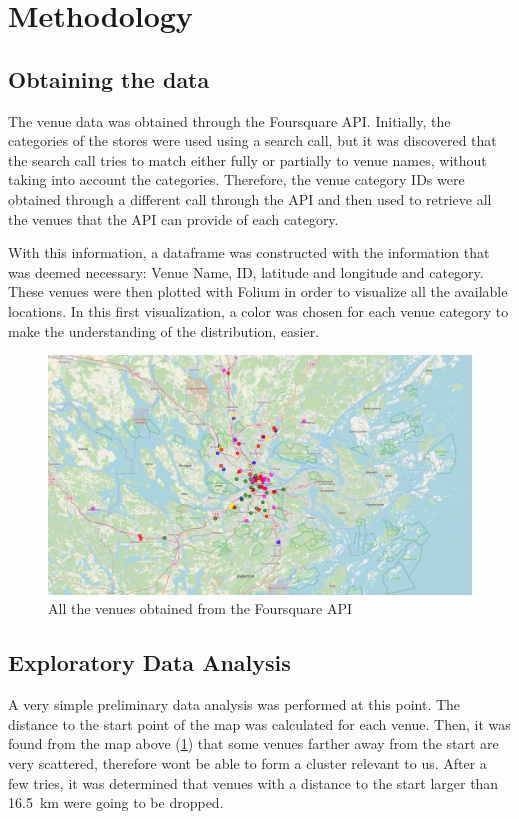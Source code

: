 \documentclass{article}
\begin{document}
\section{Methodology}

	\subsection{Obtaining the data}
		The venue data was obtained through the Foursquare API. Initially, the categories of the stores were used using a search call, but it was discovered that the search call tries to match either fully or partially to venue names, without taking into account the categories.
		Therefore, the venue category IDs were obtained through a different call through the API and then used to retrieve all the venues that the API can provide of each category.
		
		With this information, a dataframe was constructed with the information that was deemed necessary: Venue Name, ID, latitude and longitude and category. These venues were then plotted with Folium in order to visualize all the available locations. In this first visualization, a color was chosen for each venue category to make the understanding of the distribution, easier. 
		\begin{figure}[H]
			\centering
			\includegraphics[width=\textwidth]{img/map1.jpg}
			\caption{All the venues obtained from the Foursquare API}
			\label{fig::map1}
		\end{figure}
	\subsection{Exploratory Data Analysis}
	
		A very simple preliminary data analysis was performed at this point. The distance to the start point of the map was calculated for each venue. Then, it was found from the map above (\ref{fig::map1}) that some venues farther away from the start are very scattered, therefore wont be able to form a cluster relevant to us. After a few tries, it was determined that venues with a distance to the start larger than \SI{16.5}{\kilo \meter} were going to be dropped. 
		
\end{document}
